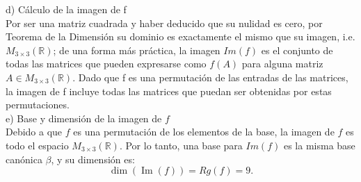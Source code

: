 \begin{solution}
d) Cálculo de la imagen de f \\
Por ser una matriz cuadrada y haber deducido que su nulidad es cero, por Teorema de la Dimensión su dominio es exactamente el mismo que su imagen, i.e. \( M_{3 \times 3}(\mathbb{R})\); de una forma más práctica, la imagen $Im(f)$ es el conjunto de todas las matrices que pueden expresarse como $f(A)$ para alguna matriz \( A \in M_{3 \times 3}(\mathbb{R}) \). Dado que f es una permutación de las entradas de las matrices, la imagen de f incluye todas las matrices que puedan ser obtenidas por estas permutaciones. \\


e) Base y dimensión de la imagen de $f$ \\
Debido a que $f$ es una permutación de los elementos de la base, la imagen de $f$ es todo el espacio \( M_{3 \times 3}(\mathbb{R}) \). Por lo tanto, una base para $Im(f)$ es la misma base canónica $\beta$, y su dimensión es:
\[ \dim(\operatorname{Im}(f)) = Rg(f) = 9. \]
    
\end{solution}